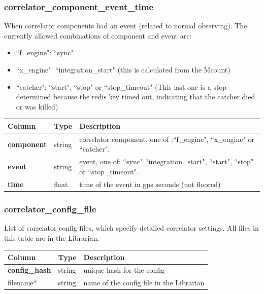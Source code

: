 \documentclass{article}
\begin{document}
{\subsubsection{correlator\_component\_event\_time}
When correlator components had an event (related to normal observing). The currently allowed combinations of component and event are:
\begin{itemize}
  \item ``f\_engine": ``sync"
  \item ``x\_engine": ``integration\_start" (this is calculated from the Mcount)
  \item ``catcher": ``start", ``stop" or ``stop\_timeout" (This last one is a stop determined because the redis key timed out, indicating that the catcher died or was killed)
 \end{itemize}
\begin{center}
 \begin{tabular}{| p{4cm} | p{2cm} | p{10cm} |}
\hline
 {\bf Column} & {\bf Type}  & {\bf Description} \\ [0.5ex]  \hline\hline
\textbf{component} & string & correlator component, one of :``f\_engine", ``x\_engine" or ``catcher".\\ \hline
\textbf{event} & string & event, one of: ``sync" ``integration\_start", ``start", ``stop" or ``stop\_timeout".\\ \hline
\textbf{time} & float & time of the event in gps seconds (not floored)\\ \hline
\end{tabular}
\end{center}

\subsubsection{correlator\_config\_file}
List of correlator config files, which specify detailed correlator settings. All files in this table are in the Librarian.
\begin{center}
 \begin{tabular}{| p{4cm} | p{2cm} | p{10cm} |}
\hline
 {\bf Column} & {\bf Type}  & {\bf Description} \\ [0.5ex]  \hline\hline
\textbf{config\_hash} & string & unique hash for the config\\ \hline
filename* & string & name of the config file in the Librarian \\\hline
\end{tabular}
\end{center}

}
\end{document}
